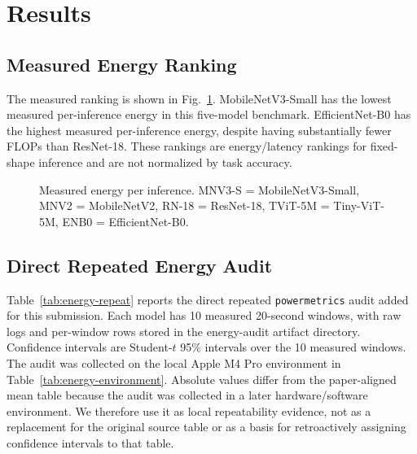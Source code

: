 \documentclass{svproc}
\begin{document}
\section{Results}

\subsection{Measured Energy Ranking}
The measured ranking is shown in Fig.~\ref{fig:measured-energy}.
MobileNetV3-Small has the lowest measured per-inference energy in this
five-model benchmark. EfficientNet-B0 has the highest measured per-inference
energy, despite having substantially fewer FLOPs than ResNet-18. These
rankings are energy/latency rankings for fixed-shape inference and are not
normalized by task accuracy.

\begin{figure}[ht]
\centering
{}
\caption{Measured energy per inference. MNV3-S = MobileNetV3-Small, MNV2 = MobileNetV2, RN-18 = ResNet-18, TViT-5M = Tiny-ViT-5M, ENB0 = EfficientNet-B0.}
\label{fig:measured-energy}
\end{figure}

\subsection{Direct Repeated Energy Audit}
Table~\ref{tab:energy-repeat} reports the direct repeated
\texttt{powermetrics} audit added for this submission. Each model has 10
measured 20-second windows, with raw logs and per-window rows stored in the
energy-audit artifact directory. Confidence intervals are Student-$t$ 95\%
intervals over the 10 measured windows. The audit was collected on the local
Apple M4 Pro environment in Table~\ref{tab:energy-environment}. Absolute
values differ from the paper-aligned mean table because the audit was
collected in a later hardware/software environment. We therefore use it as
local repeatability evidence, not as a replacement for the original source
table or as a basis for retroactively assigning confidence intervals to that
table.
\end{document}
